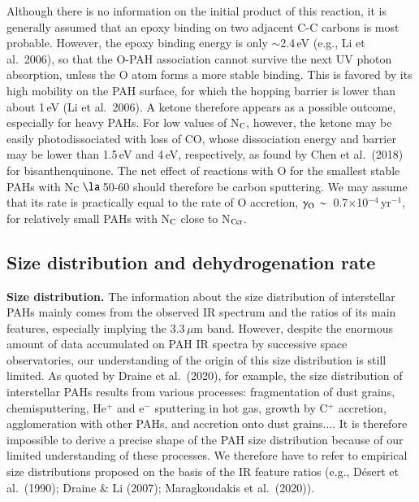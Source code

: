 \documentclass{aa}
\begin{document}
Although there is no information on the initial product of this reaction, 
it is generally assumed that an epoxy binding on two adjacent C-C carbons 
is most probable. However, the epoxy binding energy is only $\sim$2.4\,eV 
(e.g., Li et al.\ 2006), so that the O-PAH association cannot survive the 
next UV photon absorption, unless the O atom forms a more stable binding. 
This is favored by its high mobility on the PAH surface, for which the hopping barrier is lower than about 1\,eV (Li et al.\ 2006). A ketone therefore appears as a possible outcome, especially for heavy PAHs. For low values of  N$_{\rm C}$, however, the ketone may be easily photodissociated with loss of CO, whose dissociation energy and barrier may be lower than 1.5\,eV and 4\,eV, respectively, as found by Chen et al.\ (2018) for bisanthenquinone. The net effect of reactions with O for the smallest stable PAHs with N$_{\rm C}$\,$\la$\,50-60 should therefore be carbon sputtering. We may assume that its rate is practically equal to the rate of O accretion, 
$\gamma_{\rm O}\,\sim$~0.7$\times$10$^{-4}$\,yr$^{-1}$, for relatively small PAHs with N$_{\rm C}$ close to N$_{\rm Ccr}$.


\subsection{Size distribution and dehydrogenation rate}
{\bf Size distribution.}
The information about the size distribution of interstellar PAHs mainly comes from the observed IR spectrum and the ratios of its main features, especially implying the 3.3\,$\mu$m band. However, despite the enormous amount of data accumulated on PAH IR spectra by successive space observatories, our understanding of the origin of this size distribution is still limited. As quoted by Draine et al.\ (2020), for example,
 the size distribution of interstellar PAHs  results from various  processes:  fragmentation of dust grains, chemisputtering, He$^+$ and e$^-$ sputtering in hot gas, growth by C$^+$ accretion, agglomeration with other PAHs, and accretion onto dust grains.... It is therefore impossible to derive a precise shape of the PAH size distribution because of our limited understanding of these processes. We therefore have to refer to empirical size distributions proposed on the basis of the IR feature ratios (e.g., D\'esert et al.\ (1990); Draine \& Li (2007); Maragkoudakis et al.\ (2020)).
\end{document}
